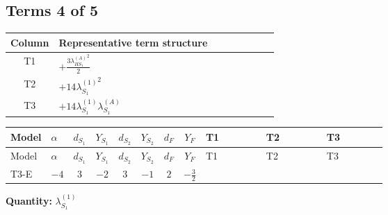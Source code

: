 \documentclass[8pt]{article}
\begin{document}
\begin{landscape}
\subsection*{Terms 4 of 5}
\begin{center}
\begin{tabular}{@{}c >{\raggedright\arraybackslash}p{0.82\linewidth}@{}}
\toprule
Column & Representative term structure \\
\midrule
T1 & \(\displaystyle +\frac{3 {\lambda_{HS_1}^{(A)}}^2}{2}\) \\
\midrule
T2 & \(\displaystyle +14 {\lambda_{S_1}^{(1)}}^2\) \\
\midrule
T3 & \(\displaystyle +14 {\lambda_{S_1}^{(1)}} {\lambda_{S_1}^{(A)}}\) \\
\midrule
\bottomrule
\end{tabular}
\end{center}
\smallskip
\tiny
\begin{longtable}{@{}llcccccc >{\raggedright\arraybackslash}p{0.21\linewidth} >{\raggedright\arraybackslash}p{0.21\linewidth} >{\raggedright\arraybackslash}p{0.21\linewidth}@{}}
\toprule
Model & $\alpha$ & $d_{S_1}$ & $Y_{S_1}$ & $d_{S_2}$ & $Y_{S_2}$ & $d_F$ & $Y_F$ & T1 & T2 & T3 \\
\midrule
\endfirsthead
\toprule
Model & $\alpha$ & $d_{S_1}$ & $Y_{S_1}$ & $d_{S_2}$ & $Y_{S_2}$ & $d_F$ & $Y_F$ & T1 & T2 & T3 \\
\midrule
\endhead
T3-E & $-4$ & $3$ & $-2$ & $3$ & $-1$ & $2$ & $-\frac{3}{2}$ & \scriptsize\adjustbox{max width=\linewidth}{$\begin{gathered} +\frac{3 {\lambda_{HS_1}^{(A)}}^2}{2}\end{gathered}$} & \scriptsize\adjustbox{max width=\linewidth}{$\begin{gathered} +14 {\lambda_{S_1}^{(1)}}^2\end{gathered}$} & \scriptsize\adjustbox{max width=\linewidth}{$\begin{gathered} +14 {\lambda_{S_1}^{(1)}} {\lambda_{S_1}^{(A)}}\end{gathered}$} \\
\midrule
\bottomrule
\end{longtable}
\clearpage
\noindent\textbf{Quantity: }$\lambda_{S_1}^{(1)}$\par\smallskip

\end{landscape}
\end{document}
